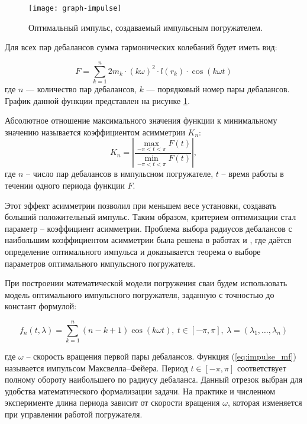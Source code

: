 \begin{figure}[ht]
    \centering
    \texttt{[image: graph-impulse]}
    \caption{Оптимальный импульс, создаваемый импульсным погружателем.}
    \label{fig:graph-impulse}
\end{figure}

\noindent Для всех пар дебалансов сумма гармонических колебаний будет иметь вид:

\begin{equation}
    \label{eq:F}
    F = \sum\limits_{k = 1}^n 2 m_k \cdot (k \omega)^2 \cdot l(r_k) \cdot \cos (k \omega t)
\end{equation}
\noindent где $n$ --- количество пар дебалансов, $k$ --- порядковый номер пары дебалансов. График данной функции
представлен на рисунке \ref{fig:graph-impulse}.

Абсолютное отношение максимального значения функции к минимальному значению называется коэффициентом асимметрии $K_n$:
\begin{equation}
    \label{eq:asymm-coef}
    K_n = \left| \frac{ \max\limits_{-\pi<t<\pi} F(t)}{\min\limits_{-\pi<t<\pi} F(t)}\right|,
\end{equation}
где $n$ -- число пар дебалансов в импульсном погружателе, $t$ -- время работы в течении одного периода функции $F$.

Этот эффект асимметрии позволил при меньшем весе установки, создавать больший положительный импульс. Таким образом,
критерием оптимизации стал параметр – коэффициент асимметрии. Проблема выбора радиусов дебалансов с наибольшим
коэффициентом асимметрии была решена в работах \cite{kostin_va} и \cite{kostin_dv}, где даётся определение оптимального
импульса и доказывается теорема о выборе параметров оптимального импульсного погружателя.

При построении математической модели погружения сваи будем использовать модель оптимального импульсного погружателя,
заданную с точностью до констант формулой:

\begin{equation}
    \label{eq:impulse_mf}
    f_n(t, \lambda) = \sum\limits_{k = 1}^n (n-k+1) \cos(k \omega t),\ t \in [-\pi, \pi],\ \lambda =(\lambda_1, \ldots,\lambda_n)
\end{equation}

\noindent где $\omega$ -- скорость вращения первой пары дебалансов. Функция (\ref{eq:impulse_mf}) называется импульсом Максвелла–Фейера.
Период $t \in [-\pi, \pi]$ соответствует полному обороту наибольшего по радиусу дебаланса. Данный отрезок выбран для удобства
математического формализации задачи. На практике и численном эксперименте длина периода зависит от скорости вращения $\omega$, которая
изменяется при управлении работой погружателя.


